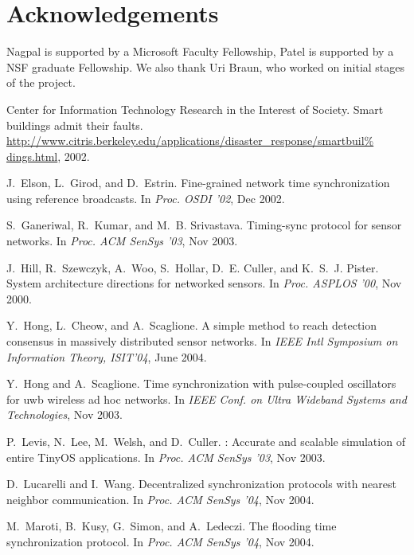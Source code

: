 \documentclass{sig-alternate}
\begin{document}
{\section{Acknowledgements}

Nagpal is supported by a Microsoft Faculty Fellowship, Patel is
supported by a NSF graduate Fellowship. We also thank Uri Braun, who
worked on initial stages of the project.

\begin{thebibliography}{10}

{Center for Information Technology Research in the Interest of Society}.
\newblock Smart buildings admit their faults.
\newblock
  \url{http://www.citris.berkeley.edu/applications/disaster_response/smartbuil%
dings.html}, 2002.

J.~Elson, L.~Girod, and D.~Estrin.
\newblock Fine-grained network time synchronization using reference broadcasts.
\newblock In {\em Proc. OSDI '02}, Dec 2002.

S.~Ganeriwal, R.~Kumar, and M.~B. Srivastava.
\newblock Timing-sync protocol for sensor networks.
\newblock In {\em Proc. ACM SenSys '03}, Nov 2003.

J.~Hill, R.~Szewczyk, A.~Woo, S.~Hollar, D.~E. Culler, and K.~S.~J. Pister.
\newblock System architecture directions for networked sensors.
\newblock In {\em Proc. ASPLOS '00}, Nov 2000.

Y.~Hong, L.~Cheow, and A.~Scaglione.
\newblock A simple method to reach detection consensus in massively distributed
  sensor networks.
\newblock In {\em IEEE Intl Symposium on Information Theory, ISIT'04}, June
  2004.

Y.~Hong and A.~Scaglione.
\newblock Time synchronization with pulse-coupled oscillators for uwb wireless
  ad hoc networks.
\newblock In {\em IEEE Conf. on Ultra Wideband Systems and Technologies}, Nov
  2003.

P.~Levis, N.~Lee, M.~Welsh, and D.~Culler.
: {A}ccurate and scalable simulation of entire {TinyOS}
  applications.
\newblock In {\em Proc. ACM SenSys '03}, Nov 2003.

D.~Lucarelli and I.~Wang.
\newblock Decentralized synchronization protocols with nearest neighbor
  communication.
\newblock In {\em Proc. ACM SenSys '04}, Nov 2004.

M.~Maroti, B.~Kusy, G.~Simon, and A.~Ledeczi.
\newblock The flooding time synchronization protocol.
\newblock In {\em Proc. ACM SenSys '04}, Nov 2004.


\end{thebibliography}}
\end{document}

